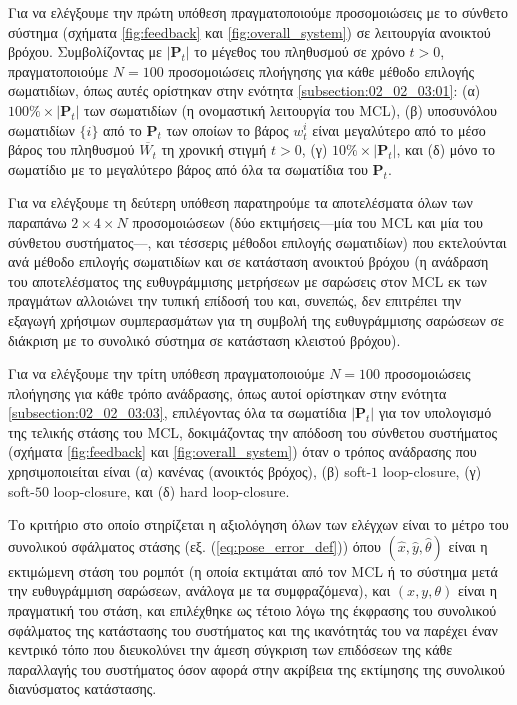Για να ελέγξουμε την πρώτη υπόθεση πραγματοποιούμε προσομοιώσεις με το σύνθετο
σύστημα (σχήματα \ref{fig:feedback} και \ref{fig:overall_system}) σε
λειτουργία ανοικτού βρόχου. Συμβολίζοντας με $|\bm{P}_t|$ το μέγεθος του
πληθυσμού σε χρόνο $t>0$, πραγματοποιούμε $N=100$ προσομοιώσεις πλοήγησης για
κάθε μέθοδο επιλογής σωματιδίων, όπως αυτές ορίστηκαν στην ενότητα
\ref{subsection:02_02_03:01}: (α) $100\% \times |\bm{P}_t|$ των σωματιδίων (η
ονομαστική λειτουργία του MCL), (β) υποσυνόλου σωματιδίων $\{i\}$ από το
$\bm{P}_t$ των οποίων το βάρος $w_t^i$ είναι μεγαλύτερο από το μέσο βάρος του
πληθυσμού $\overline{W_t}$ τη χρονική στιγμή $t>0$, (γ) $10\% \times
|\bm{P}_t|$, και (δ) μόνο το σωματίδιο με το μεγαλύτερο βάρος από όλα τα
σωματίδια του $\bm{P}_t$.

Για να ελέγξουμε τη δεύτερη υπόθεση παρατηρούμε τα αποτελέσματα όλων των
παραπάνω $2\times4\times N$ προσομοιώσεων (δύο εκτιμήσεις---μία του MCL και μία
του σύνθετου συστήματος---, και τέσσερις μέθοδοι επιλογής σωματιδίων) που
εκτελούνται ανά μέθοδο επιλογής σωματιδίων και σε κατάσταση ανοικτού βρόχου (η
ανάδραση του αποτελέσματος της ευθυγράμμισης μετρήσεων με σαρώσεις στον MCL εκ
των πραγμάτων αλλοιώνει την τυπική επίδοσή του και, συνεπώς, δεν επιτρέπει την
εξαγωγή χρήσιμων συμπερασμάτων για τη συμβολή της ευθυγράμμισης σαρώσεων σε
διάκριση με το συνολικό σύστημα σε κατάσταση κλειστού βρόχου).

Για να ελέγξουμε την τρίτη υπόθεση πραγματοποιούμε $N=100$ προσομοιώσεις
πλοήγησης για κάθε τρόπο ανάδρασης, όπως αυτοί ορίστηκαν στην ενότητα
\ref{subsection:02_02_03:03}, επιλέγοντας όλα τα σωματίδια $|\bm{P}_t|$ για τον
υπολογισμό της τελικής στάσης του MCL, δοκιμάζοντας την απόδοση του σύνθετου
συστήματος (σχήματα \ref{fig:feedback} και \ref{fig:overall_system}) όταν ο
τρόπος ανάδρασης που χρησιμοποιείται είναι (α) κανένας (ανοικτός βρόχος), (β)
soft-$1$ loop-closure, (γ) soft-$50$ loop-closure, και (δ) hard loop-closure.

Το κριτήριο στο οποίο στηρίζεται η αξιολόγηση όλων των ελέγχων είναι το μέτρο
του συνολικού σφάλματος στάσης (εξ. (\ref{eq:pose_error_def})) όπου
$(\hat{x}, \hat{y}, \hat{\theta})$ είναι η εκτιμώμενη στάση του ρομπότ (η οποία
εκτιμάται από τον MCL ή το σύστημα μετά την ευθυγράμμιση σαρώσεων, ανάλογα με
τα συμφραζόμενα), και $(x,y,\theta)$ είναι η πραγματική του στάση, και
επιλέχθηκε ως τέτοιο λόγω της έκφρασης του συνολικού σφάλματος της κατάστασης
του συστήματος και της ικανότητάς του να παρέχει έναν κεντρικό τόπο που
διευκολύνει την άμεση σύγκριση των επιδόσεων της κάθε παραλλαγής του συστήματος
όσον αφορά στην ακρίβεια της εκτίμησης της συνολικού διανύσματος κατάστασης.

